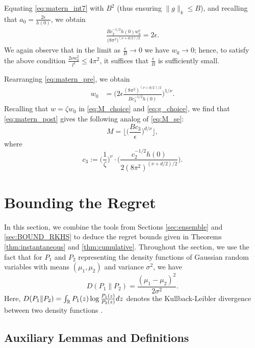\documentclass[english,onecolumn,final,11pt]{IEEEtran} %
\begin{document}
Equating \eqref{eq:matern_int7} with $B^2$ (thus ensuring $\|g\|_k \le B$), and recalling that $a_0 = \frac{2\epsilon}{h(0)}$, we obtain
\begin{align}
    \frac{B c_2^{-1/2} h(0) w_0^{\nu}}{ \big( 8\pi^2 \big)^{(\nu + d/2)/2} } = 2\epsilon. \label{eq:matern_pre}
\end{align}
We again observe that in the limit as $\frac{\epsilon}{B} \to 0$ we have $w_0 \to 0$; hence, to satisfy the above condition $\frac{2\nu w_0^2}{l^2} \le 4\pi^2$, it suffices that $\frac{\epsilon}{B}$ is sufficiently small.

Rearranging \eqref{eq:matern_pre}, we obtain
\begin{align}
    w_0 &= \Bigg( 2\epsilon \frac{ (8\pi^2)^{(\nu + d/2)/2} }{ B c_2^{-1/2} h(0) } \Bigg)^{1/\nu}. \label{eq:matern_post}
\end{align}
Recalling that $w = \zeta w_0$ in \eqref{eq:M_choice} and \eqref{eq:g_choice}, we find that \eqref{eq:matern_post} gives the following analog of \eqref{eq:M_se}:
\begin{equation}
    M = \Big\lfloor \Big( \frac{B c_3}{\epsilon} \Big)^{d/\nu} \Big\rfloor, \label{eq:M_matern}
\end{equation}
where 
\begin{equation}
    c_3 :=  \Big( \frac{1}{\zeta} \Big)^{\nu} \cdot \Bigg( \frac{ c_2^{-1/2} h(0) }{ 2 (8\pi^2)^{(\nu + d/2)/2} } \Bigg).
\end{equation}

\section{Bounding the Regret}

In this section, we combine the tools from Sections \ref{sec:ensemble} and \ref{sec:BOUND_RKHS} to deduce the regret bounds given in Theorems \ref{thm:instantaneous} and \ref{thm:cumulative}.  Throughout the section, we use the fact that for $P_1$ and $P_2$ representing the density functions of Gaussian random variables with means $(\mu_1,\mu_2)$ and variance $\sigma^2$, we have
\begin{equation}
    D(P_1 \| P_2) = \frac{ (\mu_1 - \mu_2)^2 }{ 2\sigma^2 }. \label{eq:Gaussian_div}
\end{equation}  
Here, $D(P_1 \| P_2) = \int_{\mathbb{R}} P_1(z) \log \frac{P_1(z)}{P_2(z)} dz$ denotes the Kullback-Leibler divergence between two density functions \cite{Cov01}.

\subsection{Auxiliary Lemmas and Definitions}
\end{document}
